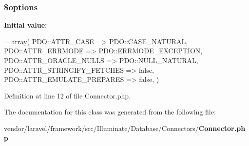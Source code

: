 \subsubsection[{\$options}]{\setlength{\rightskip}{0pt plus 5cm}\${\bf options}\hspace{0.3cm}{\ttfamily [protected]}}\label{class_illuminate_1_1_database_1_1_connectors_1_1_connector_a011800c63ece4cbbfa77136a20607023}
{\bfseries Initial value\+:}
\begin{DoxyCode}
= array(
        PDO::ATTR\_CASE => PDO::CASE\_NATURAL,
        PDO::ATTR\_ERRMODE => PDO::ERRMODE\_EXCEPTION,
        PDO::ATTR\_ORACLE\_NULLS => PDO::NULL\_NATURAL,
        PDO::ATTR\_STRINGIFY\_FETCHES => \textcolor{keyword}{false},
        PDO::ATTR\_EMULATE\_PREPARES => \textcolor{keyword}{false},
    )
\end{DoxyCode}


Definition at line 12 of file Connector.\+php.



The documentation for this class was generated from the following file\+:\begin{DoxyCompactItemize}
\item 
vendor/laravel/framework/src/\+Illuminate/\+Database/\+Connectors/{\bf Connector.\+php}\end{DoxyCompactItemize}
